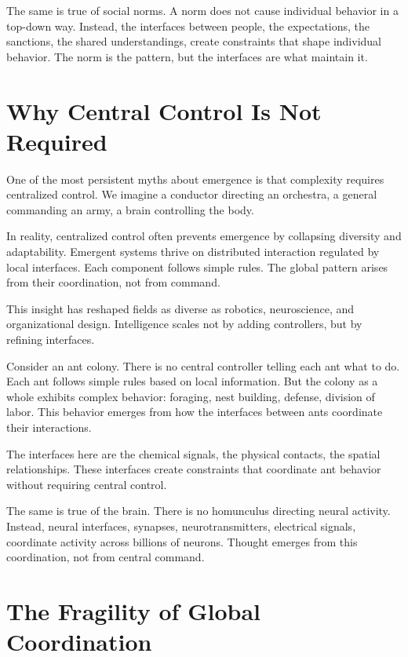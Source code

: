 \documentclass[
  openright]{book}
\begin{document}
The same is true of social norms. A norm does not cause individual
behavior in a top-down way. Instead, the interfaces between people, the
expectations, the sanctions, the shared understandings, create
constraints that shape individual behavior. The norm is the pattern, but
the interfaces are what maintain it.

\section{Why Central Control Is Not
Required}\label{why-central-control-is-not-required}

One of the most persistent myths about emergence is that complexity
requires centralized control. We imagine a
conductor directing an orchestra, a general commanding an army, a brain
controlling the body.

In reality, centralized control often
prevents emergence by collapsing diversity and adaptability. Emergent
systems thrive on distributed interaction
regulated by local interfaces. Each component follows simple rules. The
global pattern arises from their coordination, not from command.

This insight has reshaped fields as diverse as robotics, neuroscience,
and organizational design. Intelligence scales not by adding
controllers, but by refining interfaces.

Consider an ant colony. There is no central controller telling each ant
what to do. Each ant follows simple rules based on local information.
But the colony as a whole exhibits complex behavior: foraging, nest
building, defense, division of labor. This behavior emerges from how the
interfaces between ants coordinate their interactions.

The interfaces here are the chemical signals, the physical contacts, the
spatial relationships. These interfaces create constraints that
coordinate ant behavior without requiring central control.

The same is true of the brain. There is no homunculus directing neural
activity. Instead, neural interfaces, synapses, neurotransmitters,
electrical signals, coordinate activity across billions of neurons.
Thought emerges from this coordination, not from central command.

\section{The Fragility of Global
Coordination}\label{the-fragility-of-global-coordination}
\end{document}
